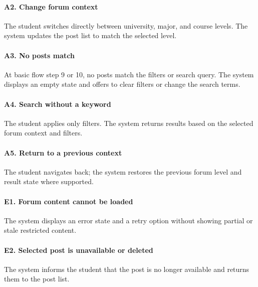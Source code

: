 \documentclass[12pt]{article}
\begin{document}
\paragraph*{A2. Change forum context}
\par\medskip
The student switches directly between university, major, and course levels. The system updates the post list to match the selected level.
\par\medskip
\hypertarget{sec:a3-no-posts-match}{}
\paragraph*{A3. No posts match}
\par\medskip
At basic flow step 9 or 10, no posts match the filters or search query. The system displays an empty state and offers to clear filters or change the search terms.
\par\medskip
\hypertarget{sec:a4-search-without-a-keyword}{}
\paragraph*{A4. Search without a keyword}
\par\medskip
The student applies only filters. The system returns results based on the selected forum context and filters.
\par\medskip
\hypertarget{sec:a5-return-to-a-previous-context}{}
\paragraph*{A5. Return to a previous context}
\par\medskip
The student navigates back; the system restores the previous forum level and result state where supported.
\par\medskip
\hypertarget{sec:e1-forum-content-cannot-be-loaded}{}
\paragraph*{E1. Forum content cannot be loaded}
\par\medskip
The system displays an error state and a retry option without showing partial or stale restricted content.
\par\medskip
\hypertarget{sec:e2-selected-post-is-unavailable-or-deleted}{}
\paragraph*{E2. Selected post is unavailable or deleted}
\par\medskip
The system informs the student that the post is no longer available and returns them to the post list.
\par\medskip
\hypertarget{sec:e3-access-is-not-permitted}{}
\end{document}
